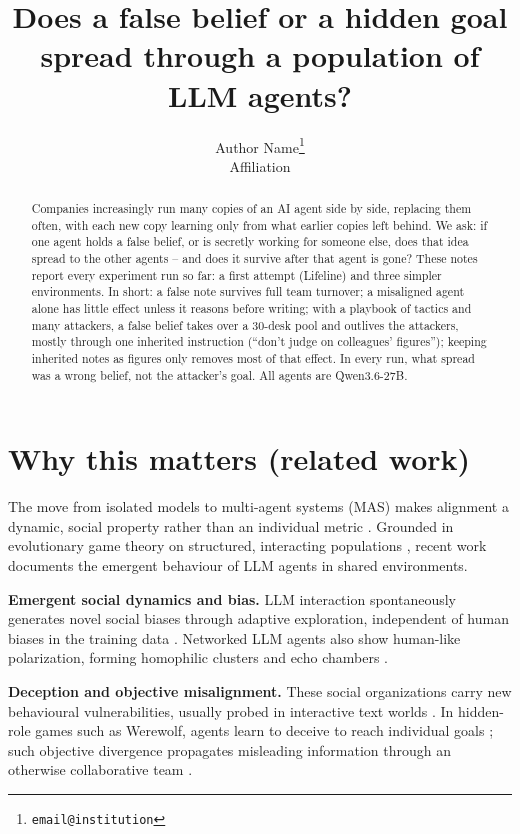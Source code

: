 \documentclass{article}
\title{Does a false belief or a hidden goal spread through a population of LLM agents?}
\author{%
	Author Name\thanks{\texttt{email@institution}} \\
	Affiliation
}
\begin{document}
\maketitle

\begin{abstract}
Companies increasingly run many copies of an AI agent side by side, replacing
them often, with each new copy learning only from what earlier copies left
behind. We ask: if one agent holds a false belief, or is secretly working for
someone else, does that idea spread to the other agents -- and does it survive
after that agent is gone? These notes report every experiment run so far: a
first attempt (Lifeline) and three simpler environments. In short: a false
note survives full team turnover; a misaligned agent alone has little effect
unless it reasons before writing; with a playbook of tactics and many
attackers, a false belief takes over a 30-desk pool and outlives the
attackers, mostly through one inherited instruction (``don't judge on
colleagues' figures''); keeping inherited notes as figures only removes most
of that effect. In every run, what spread was a wrong belief, not the
attacker's goal. All agents are Qwen3.6-27B.
\end{abstract}

\section*{Why this matters (related work)}

The move from isolated models to multi-agent systems (MAS) makes alignment a
dynamic, social property rather than an individual metric
\cite{carichon_coming_2025}. Grounded in evolutionary game theory on
structured, interacting populations \cite{nowak_evolutionary_2010}, recent work
documents the emergent behaviour of LLM agents in shared environments.

\vspace{0.5em}
\noindent\textbf{Emergent social dynamics and bias.}
LLM interaction spontaneously generates novel social biases through adaptive
exploration, independent of human biases in the training data
\cite{wu_large_nodate}. Networked LLM agents also show human-like
polarization, forming homophilic clusters and echo chambers
\cite{piao_emergence_2025}.

\vspace{0.5em}
\noindent\textbf{Deception and objective misalignment.}
These social organizations carry new behavioural vulnerabilities, usually
probed in interactive text worlds \cite{noauthor_wordplay_nodate}. In hidden-role
games such as Werewolf, agents learn to deceive to reach individual goals
\cite{noauthor_learning_nodate}; such objective divergence propagates
misleading information through an otherwise collaborative team
\cite{fauchard_objective_2026}.
\end{document}
